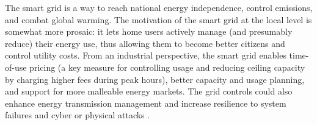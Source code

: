 The smart grid is a way to reach national energy independence, control emissions, and combat global warming. The motivation of the smart grid at the local level is somewhat more prosaic: it lets home users actively manage (and presumably reduce) their energy use, thus allowing them to become better citizens and control utility costs. From an industrial perspective, the smart grid enables time-of-use pricing (a key measure for controlling usage and reducing ceiling capacity by charging higher fees during peak hours), better capacity and usage planning, and support for more malleable energy markets. The grid controls could also enhance energy transmission management and increase resilience to system failures and cyber or physical attacks \cite{McDanielMcLaughlin2009a}.


